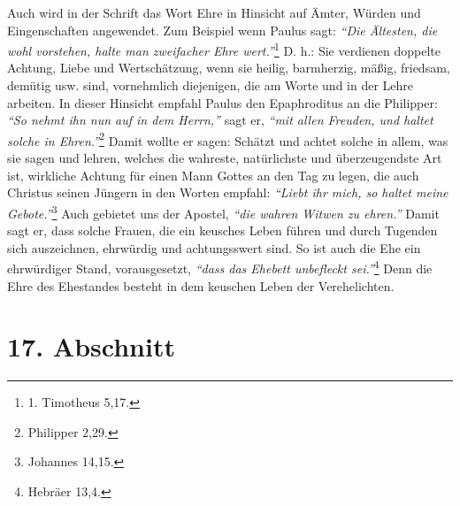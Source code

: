 Auch wird in der Schrift das Wort Ehre in Hinsicht auf Ämter, Würden und
Eingenschaften angewendet. Zum Beispiel wenn Paulus sagt:
\textit{"`Die Ältesten, die wohl
vorstehen, halte man zweifacher Ehre wert."'}\footnote{1. Timotheus 5,17.}
D. h.: Sie
verdienen doppelte Achtung, Liebe und Wertschätzung, wenn sie heilig,
barmherzig, mäßig, friedsam, demütig usw. sind, vornehmlich diejenigen, die
am Worte und in der Lehre arbeiten. In dieser
Hinsicht empfahl Paulus den
Epaphroditus an die Philipper:
\textit{"`So nehmt ihn nun auf in dem Herrn,"'} sagt er,
\textit{"`mit allen Freuden, und haltet solche in Ehren."'}\footnote{Philipper
2,29.}
Damit
wollte er sagen: Schätzt und achtet solche in allem, was sie sagen und lehren,
welches die wahreste, natürlichste und überzeugendste Art ist, wirkliche Achtung
für einen Mann Gottes an den Tag zu legen, die auch Christus seinen Jüngern in
den Worten empfahl:
\textit{"`Liebt ihr mich, so haltet meine Gebote."'}\footnote{Johannes 14,15.}
Auch gebietet uns der Apostel,
\textit{"`die wahren Witwen zu ehren."'} Damit
sagt er, dass solche Frauen, die ein keusches Leben führen und durch Tugenden
sich auszeichnen, ehrwürdig und achtungsswert sind. So ist auch die Ehe ein
ehrwürdiger Stand, vorausgesetzt,
\textit{"`dass das Ehebett unbefleckt sei."'}\footnote{Hebräer 13,4.}
Denn die Ehre des Ehestandes besteht in dem keuschen
Leben der Verehelichten.

\section{17. Abschnitt} \label{kap9_ab17}

